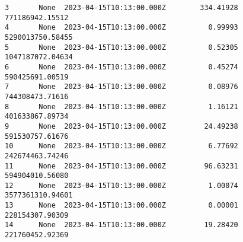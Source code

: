 \documentclass[11pt]{article}
\begin{document}
\begin{tcolorbox}[breakable, size=fbox, boxrule=.5pt, pad at break*=1mm, opacityfill=0]
\begin{Verbatim}[commandchars=\\\{\}]
3       None  2023-04-15T10:13:00.000Z        334.41928       771186942.15512
4       None  2023-04-15T10:13:00.000Z          0.99993      5290013750.58455
5       None  2023-04-15T10:13:00.000Z          0.52305      1047187072.04634
6       None  2023-04-15T10:13:00.000Z          0.45274       590425691.00519
7       None  2023-04-15T10:13:00.000Z          0.08976       744308473.71616
8       None  2023-04-15T10:13:00.000Z          1.16121       401633867.89734
9       None  2023-04-15T10:13:00.000Z         24.49238       591530757.61676
10      None  2023-04-15T10:13:00.000Z          6.77692       242674463.74246
11      None  2023-04-15T10:13:00.000Z         96.63231       594904010.56080
12      None  2023-04-15T10:13:00.000Z          1.00074      3577361310.94601
13      None  2023-04-15T10:13:00.000Z          0.00001       228154307.90309
14      None  2023-04-15T10:13:00.000Z         19.28420       221760452.92369


\end{Verbatim}
\end{tcolorbox}
\end{document}
